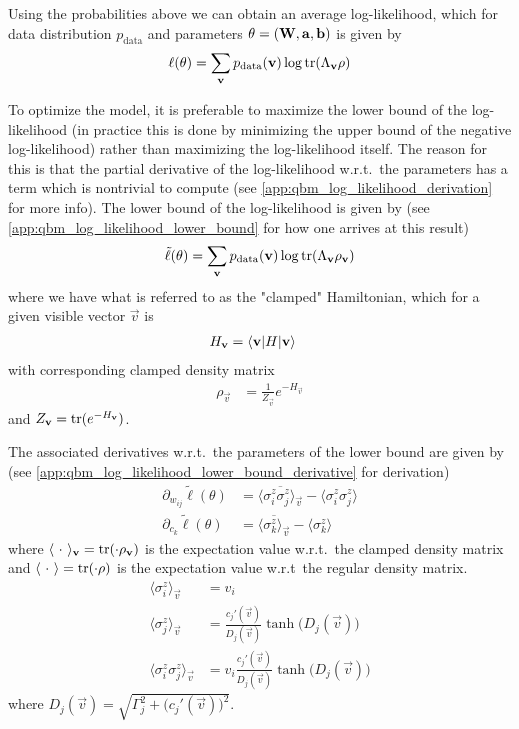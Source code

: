 Using the probabilities above we can obtain an average log-likelihood, which for data distribution \( p_\text{data} \) and parameters \( \theta = (\mathbf{W}, \mathbf{a}, \mathbf{b}) \) is given by
\begin{align}
    \ell(\theta) = \sum_{\mathbf{v}} p_{\text{data}}(\mathbf{v}) \log \text{tr}(\Lambda_{\mathbf{v}}\rho)
\end{align}

To optimize the model, it is preferable to maximize the lower bound of the log-likelihood (in practice this is done by minimizing the upper bound of the negative log-likelihood) rather than maximizing the log-likelihood itself.
The reason for this is that the partial derivative of the log-likelihood w.r.t.\ the parameters has a term which is nontrivial to compute (see \cref{app:qbm_log_likelihood_derivation} for more info).
The lower bound of the log-likelihood is given by (see \cref{app:qbm_log_likelihood_lower_bound} for how one arrives at this result)
\begin{align}
    \tilde{\ell}(\theta) = \sum_{\mathbf{v}} p_{\text{data}}(\mathbf{v}) \log \text{tr}(\Lambda_{\mathbf{v}}\rho_{\mathbf{v}})
\end{align}
where we have what is referred to as the "clamped" Hamiltonian, which for a given visible vector \( \vec{v} \) is
\begin{align}
    H_{\mathbf{v}}
        &= \braket{\mathbf{v}|H|\mathbf{v}}
\end{align}
with corresponding clamped density matrix
\begin{align}
    \rho_\vec{v}
        &= \frac{1}{Z_\vec{v}} e^{-H_\vec{v}}
\end{align}
and \( Z_{\mathbf{v}} = \text{tr}(e^{-H_{\mathbf{v}}}) \).

The associated derivatives w.r.t.\ the parameters of the lower bound are given by (see \cref{app:qbm_log_likelihood_lower_bound_derivative} for derivation)
\begin{align}
    \partial_{w_{ij}} \tilde{\ell}(\theta)
        &= \overline{\langle \sigma_i^z \sigma_j^z \rangle_\vec{v}} - \langle \sigma_i^z \sigma_j^z \rangle \\
    \partial_{c_k} \tilde{\ell}(\theta)
        &= \overline{\langle \sigma_k^z \rangle_\vec{v}} - \langle \sigma_k^z \rangle
\end{align}
where \( \langle \ \cdot \ \rangle_{\mathbf{v}} = \text{tr}(\cdot \rho_{\mathbf{v}}) \) is the expectation value w.r.t.\ the clamped density matrix and \( \langle \ \cdot \ \rangle = \text{tr}(\cdot \rho) \) is the expectation value w.r.t\ the regular density matrix.
\begin{align}
    \langle \sigma_i^z \rangle_\vec{v}
        &= v_i \\
    \langle \sigma_j^z \rangle_\vec{v}
        &= \frac{c_j'(\vec{v})}{D_j(\vec{v})} \tanh\big(D_j(\vec{v})\big) \\
    \langle \sigma_i^z \sigma_j^z \rangle_{\vec{v}}
        &= v_i \frac{c_j'(\vec{v})}{D_j(\vec{v})} \tanh\big(D_j(\vec{v})\big)
\end{align}
where \( D_j(\vec{v}) = \sqrt{\Gamma_j^2 + \big(c_j'(\vec{v})\big)^2} \).


